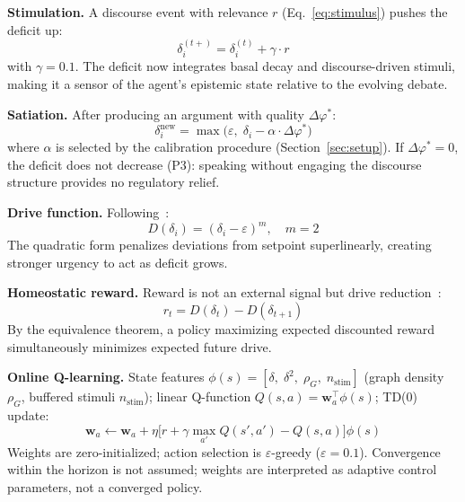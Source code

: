 \documentclass{llncs}
\begin{document}
\textbf{Stimulation.} A discourse event with relevance $r$ (Eq.~\ref{eq:stimulus})
pushes the deficit up:
\begin{equation}
    \delta_i^{(t+)} = \delta_i^{(t)} + \gamma \cdot r
    \label{eq:stimulate}
\end{equation}
with $\gamma = 0.1$. The deficit now integrates basal decay and discourse-driven
stimuli, making it a sensor of the agent's epistemic state relative to the
evolving debate.

\textbf{Satiation.} After producing an argument with quality $\Delta\varphi^*$:
\begin{equation}
    \delta_i^{\text{new}} = \max\!\bigl(\varepsilon,\;
        \delta_i - \alpha \cdot \Delta\varphi^*\bigr)
    \label{eq:satiation}
\end{equation}
where $\alpha$ is selected by the calibration procedure (Section~\ref{sec:setup}).
If $\Delta\varphi^* = 0$, the deficit does not decrease (P3): speaking without
engaging the discourse structure provides no regulatory relief.

\textbf{Drive function.} Following~\textcite{keramati2014homeostatic}:
\begin{equation}
    D(\delta_i) = (\delta_i - \varepsilon)^m, \quad m = 2
    \label{eq:drive}
\end{equation}
The quadratic form penalizes deviations from setpoint superlinearly, creating
stronger urgency to act as deficit grows.

\textbf{Homeostatic reward.} Reward is not an external signal but drive
reduction~\parencite{keramati2014homeostatic}:
\begin{equation}
    r_t = D(\delta_t) - D(\delta_{t+1})
    \label{eq:reward}
\end{equation}
By the equivalence theorem, a policy maximizing expected discounted reward
simultaneously minimizes expected future drive.

\textbf{Online Q-learning.} State features
$\phi(s) = [\delta,\; \delta^2,\; \rho_G,\; n_{\text{stim}}]$
(graph density $\rho_G$, buffered stimuli $n_{\text{stim}}$); linear
Q-function $Q(s,a) = \mathbf{w}_a^\top \phi(s)$; TD(0) update:
\begin{equation}
    \mathbf{w}_a \leftarrow \mathbf{w}_a + \eta \bigl[r + \gamma \max_{a'}
    Q(s', a') - Q(s, a)\bigr] \phi(s)
    \label{eq:td0}
\end{equation}
Weights are zero-initialized; action selection is $\varepsilon$-greedy
($\varepsilon=0.1$). Convergence within the horizon is not assumed; weights
are interpreted as adaptive control parameters, not a converged policy.
\end{document}

